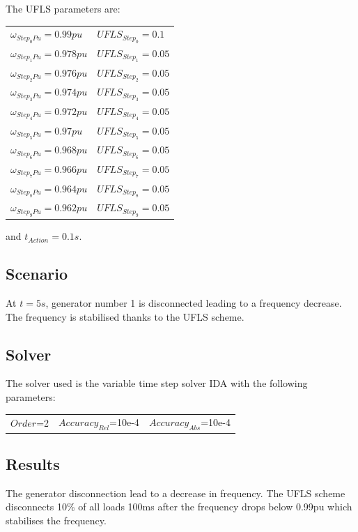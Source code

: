 \documentclass[a4paper, 12pt]{report}
\begin{document}
The UFLS parameters are:
\begin{center}
\begin{tabular}{l|l}
   $\omega_{Step_0{Pu}}=0.99pu$ & $UFLS_{Step_0}=0.1$ \\
   $\omega_{Step_1{Pu}}=0.978pu$ & $UFLS_{Step_1}=0.05$ \\
   $\omega_{Step_2{Pu}}=0.976pu$ & $UFLS_{Step_2}=0.05$ \\
   $\omega_{Step_3{Pu}}=0.974pu$ & $UFLS_{Step_3}=0.05$ \\
   $\omega_{Step_4{Pu}}=0.972pu$ & $UFLS_{Step_4}=0.05$ \\
   $\omega_{Step_5{Pu}}=0.97pu$ & $UFLS_{Step_5}=0.05$ \\
   $\omega_{Step_6{Pu}}=0.968pu$ & $UFLS_{Step_6}=0.05$ \\
   $\omega_{Step_7{Pu}}=0.966pu$ & $UFLS_{Step_7}=0.05$ \\
   $\omega_{Step_8{Pu}}=0.964pu$ & $UFLS_{Step_8}=0.05$ \\
   $\omega_{Step_9{Pu}}=0.962pu$ & $UFLS_{Step_9}=0.05$ \\
\end{tabular}
\end{center}

and $t_{Action}=0.1s$.

\subsection{Scenario}
At $t=5s$, generator number 1 is disconnected leading to a frequency decrease. The frequency is stabilised thanks to the UFLS scheme.

\subsection{Solver}
The solver used is the variable time step solver IDA with the following parameters:
\begin{center}
\begin{tabular}{l|l|l}
   $Order$=2 & $Accuracy_{Rel}$=10e-4 & $Accuracy_{Abs}$=10e-4 \\
\end{tabular}
\end{center}

\newpage
\subsection{Results}

The generator disconnection lead to a decrease in frequency. The UFLS scheme disconnects 10\% of all loads 100ms after the frequency drops below 0.99pu which stabilises the frequency.
\end{document}
